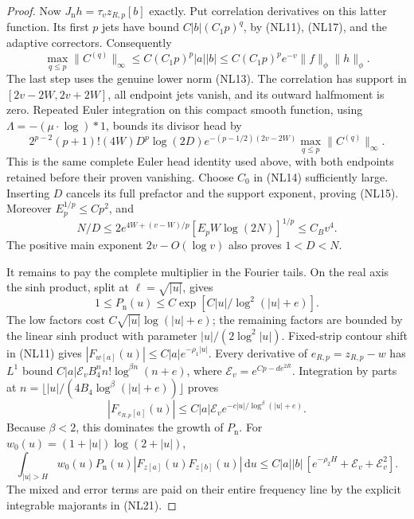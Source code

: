 \documentclass[11pt]{article}
\theoremstyle{remark}\newtheorem{remark}[theorem]{Remark}
\newcommand{\dd}{\,\mathrm d}
\begin{document}
\begin{proof}
Now \(J_{\mathrm n}h=\tau_vz_{R,p}[b]\) exactly.
Put correlation derivatives on this latter function.
Its first \(p\) jets have bound \(C|b|(C_1p)^q\), by (NL11),
(NL17), and the adaptive correctors. Consequently
\[
 \max_{q\le p}\|C^{(q)}\|_\infty
 \le C(C_1p)^p|a||b|
 \le C(C_1p)^pe^{-v}\|f\|_\phi\|h\|_\phi.                    \tag{NL19}
\]
The last step uses the genuine lower norm (NL13).
The correlation has support in \([2v-2W,2v+2W]\), all endpoint
jets vanish, and its outward halfmoment is zero.
Repeated Euler integration on this compact smooth function,
using \(\Lambda=-(\mu\cdot\log)*1\), bounds its divisor head by
\[
 2^{p-2}(p+1)!(4W)D^p\log(2D)
 e^{-(p-1/2)(2v-2W)}\max_{q\le p}\|C^{(q)}\|_\infty .
\]
This is the same complete Euler head identity used above,
with both endpoints retained before their proven vanishing.
Choose \(C_0\) in (NL14) sufficiently large. Inserting \(D\)
cancels its full prefactor and the support exponent, proving
(NL15). Moreover \(E_p^{1/p}\le Cp^2\), and
\[
 N/D\le 2e^{4W+(v-W)/p}
                  [E_pW\log(2N)]^{1/p}\le C_Bv^4.
                                                               \tag{NL20}
\]
The positive main exponent \(2v-O(\log v)\) also proves \(1<D<N\).

It remains to pay the complete multiplier in the Fourier tails.
On the real axis the sinh product, split at \(\ell=\sqrt{|u|}\),
gives
\[
 1\le P_{\mathrm n}(u)\le
       C\exp[C|u|/\log^2(|u|+e)].
\]
The low factors cost \(C\sqrt{|u|}\log(|u|+e)\); the remaining
factors are bounded by the linear sinh product with parameter
\(|u|/(2\log^2|u|)\). Fixed-strip contour shift in (NL11)
gives \(|F_{w[a]}(u)|\le C|a|e^{-\rho_1|u|}\).
Every derivative of \(e_{R,p}=z_{R,p}-w\) has \(L^1\) bound
\(C|a|\mathcal E_v B_4^nn!\log^{\beta n}(n+e)\), where
\(\mathcal E_v=e^{Cp-d e^{2R}}\).
Integration by parts at
\(n=\lfloor |u|/(4B_4\log^\beta(|u|+e))\rfloor\) proves
\[
 |F_{e_{R,p}[a]}(u)|\le
 C|a|\mathcal E_v e^{-c|u|/\log^\beta(|u|+e)} .
                                                               \tag{NL21}
\]
Because \(\beta<2\), this dominates the growth of \(P_{\mathrm n}\).
For \(w_0(u)=(1+|u|)\log(2+|u|)\),
\[
 \int_{|u|>H}w_0(u)P_{\mathrm n}(u)
    |F_{z[a]}(u)F_{z[b]}(u)|\dd u
 \le C|a||b|\,[e^{-\rho_2H}+\mathcal E_v+\mathcal E_v^2].
                                                               \tag{NL22}
\]
The mixed and error terms are paid on their entire frequency
line by the explicit integrable majorants in (NL21).


\end{proof}
\end{document}
